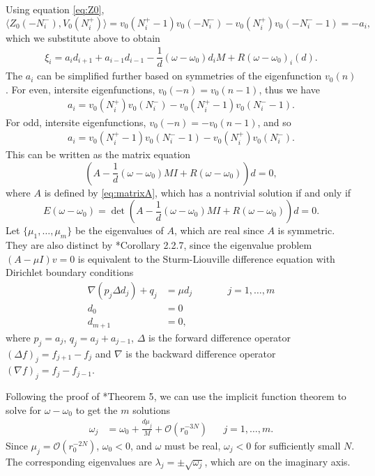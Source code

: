 \documentclass[12pt,reqno]{amsart}
\begin{document}
Using equation \cref{eq:Z0},
\[
\langle Z_0(-N_i^-), V_0(N_i^+) \rangle 
= v_0(N_i^+ - 1)v_0(-N_i^-) - v_0(N_i^+)v_0(-N_i^- - 1) = -a_i,
\]
which we substitute above to obtain
\begin{align}\label{eq:xifinal}
\xi_i = a_i d_{i+1}
+ a_{i-1} d_{i-1}
- \dfrac{1}{d} (\omega - \omega_0) d_i M 
+ R(\omega - \omega_0)_i(d).
\end{align}
The $a_i$ can be simplified further based on symmetries of the eigenfunction $v_0(n)$. For even, intersite eigenfunctions, $v_0(-n) = v_0(n-1)$, thus we have
\begin{align}\label{eq:aievenintersite}
a_i = v_0(N_i^+)v_0(N_i^-) - v_0(N_i^+ - 1)v_0(N_i^- -1).
\end{align}
For odd, intersite eigenfunctions, $v_0(-n) = -v_0(n-1)$, and so
\begin{align}\label{eq:aioddintersite}
	a_i = v_0(N_i^+ - 1)v_0(N_i^- -1) - v_0(N_i^+)v_0(N_i^-).
\end{align}
This can be written as the matrix equation
\begin{equation}\label{eq:matrixAeq}
	\left( A - \frac{1}{d}(\omega - \omega_0)MI + R(\omega-\omega_0)\right)d = 0,
\end{equation}
where $A$ is defined by \cref{eq:matrixA}, which has a nontrivial solution if and only if
\begin{equation}\label{eq:matrixdeteq}
	E(\omega - \omega_0) = 
	\det \left( A - \frac{1}{d}(\omega - \omega_0)MI + R(\omega-\omega_0)\right)d = 0.
\end{equation}
Let $\{ \mu_1, \dots, \mu_{m} \}$ be the eigenvalues of $A$, which are real since $A$ is symmetric. They are also distinct by \cite{Jirari1995}*{Corollary 2.2.7}, since the eigenvalue problem $(A - \mu I) v = 0$ is equivalent to the Sturm-Liouville difference equation with Dirichlet boundary conditions
\begin{equation*}
\begin{aligned}
\nabla( p_j \Delta d_j ) + q_j &= \mu d_j && \qquad j = 1, \dots, m \\
d_0 &= 0 \\
d_{m+1} &= 0,
\end{aligned}
\end{equation*}
where $p_j = a_j$, $q_j = a_j + a_{j-1}$, $\Delta$ is the forward difference operator $(\Delta f)_j = f_{j+1} - f_j$ and $\nabla$ is the backward difference operator $(\nabla f)_j = f_j - f_{j-1}$. 

Following the proof of \cite{Parker2020}*{Theorem 5}, we can use the implicit function theorem to solve for $\omega - \omega_0$ to get the $m$ solutions
\begin{align*}
	\omega_j &= \omega_0 + \frac{d \mu_j}{M} + \mathcal{O}(r_0^{-3N}) && j = 1, \dots, m.
\end{align*}
Since $\mu_j = \mathcal{O}(r_0^{-2N})$, $\omega_0 < 0$, and $\omega$ must be real, $\omega_j < 0$ for sufficiently small $N$. The corresponding eigenvalues are $\lambda_j = \pm \sqrt{\omega_j}$, which are on the imaginary axis.



\end{document}
